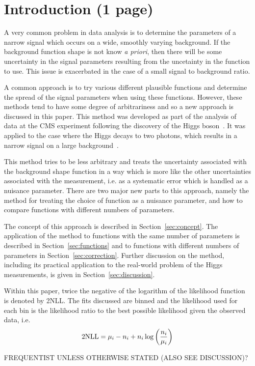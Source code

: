 \section{Introduction (1 page)}
\label{sec:introduction}

A very common problem in data analysis is to determine the parameters of
a narrow signal which occurs on a wide, smoothly varying background. If the
background function shape is not know {\it a priori}, then there will be 
some uncertainty in the signal parameters resulting from the uncetainty in
the function to use. This issue is exacerbated in the case of a small signal to
background ratio.

A common approach is to try various different plausible functions and 
determine the spread of the signal parameters when using these functions.
However, these methods tend to have some degree of arbitrariness and so
a new approach is discussed in this paper.
This method was developed as part of the analysis of data at the CMS experiment
following the discovery of the Higgs
boson~\cite{ref:introduction:atlasdis,ref:introduction:cmsdis}.
It was applied to the case where the Higgs decays to two photons, which
results in a narrow signal on a large 
background~\cite{ref:introduction:legacy}.

This method tries to be less 
arbitrary and treats the uncertainty associated with the
background shape function in a way
which is more like the other
uncertainties associated with the measurement, i.e. as a systematic error
which is handled as a nuisance parameter.
There are two major new parts to this approach, namely the method for
treating the choice of function as a nuisance parameter, and how to compare 
functions with different numbers of parameters.


The concept of this approach is described in Section~\ref{sec:concept}.
The application of the method to functions with the same number of parameters
is described in Section~\ref{sec:functions} and to functions with different
numbers of parameters in Section~\ref{sec:correction}. Further discussion on
the method, including its practical application to the real-world problem of
the Higgs measurements, is given in Section~\ref{sec:discussion}.

Within this paper, twice the negative of the logarithm of the likelihood
function is denoted by 2NLL. The fits discussed are binned and the 
likelihood used for each bin is the likelihood ratio to the best
possible likelihood given the observed data, i.e.
\begin{equation}
{\rm 2NLL} = \mu_i - n_i + n_i \log\left(\frac{n_i}{\mu_i}\right)
\label{eqn:introduction:def2NLL}
\end{equation}

FREQUENTIST UNLESS OTHERWISE STATED (ALSO SEE DISCUSSION)?
